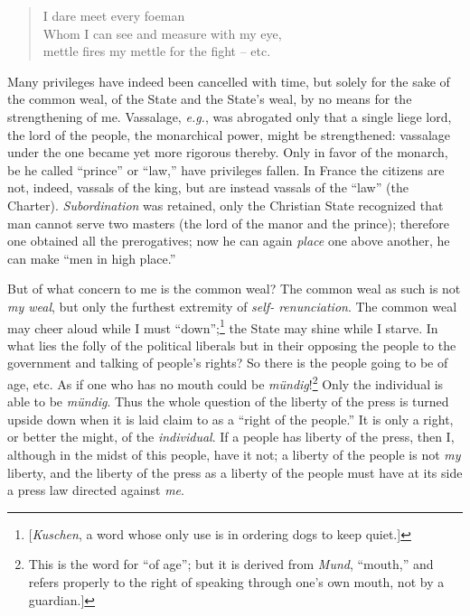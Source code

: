 \documentclass[12pt,a4paper]{book}
\begin{document}
\begin{quotation}

\noindent{} I dare meet every foeman\\
 Whom I can see and measure with my eye,\\
 mettle fires my mettle for the fight -- etc. \end{quotation}

\noindent{}Many privileges have indeed been cancelled with time, but solely 
for the sake of the common weal, of the State and the State's weal, by no 
means for the strengthening of me. Vassalage, \textit{e.g.}, was abrogated 
only that a single liege lord, the lord of the people, the monarchical power, 
might be strengthened: vassalage under the one became yet more rigorous 
thereby. Only in favor of the monarch, be he called ``prince'' or ``law,'' 
have privileges fallen. In France the citizens are not, indeed, vassals of the 
king, but are instead vassals of the ``law'' (the Charter). 
\textit{Subordination} was retained, only the Christian State recognized that 
man cannot serve two masters (the lord of the manor and the prince); therefore 
one obtained all the prerogatives; now he can again \textit{place} one above 
another, he can make ``men in high place.''

But of what concern to me is the common weal? The common weal as such is not 
\textit{my weal}, but only the furthest extremity of \textit{self- 
renunciation}. The common weal may cheer aloud while I must 
``down'';\footnote{[\textit{Kuschen}, a word whose only use is in ordering 
dogs to keep quiet.]} the State may shine while I starve. In what lies the 
folly of the political liberals but in their opposing the people to the 
government and talking of people's rights? So there is the people going to be 
of age, etc. As if one who has no mouth could be 
\textit{m\"undig}!\footnote{This is the word for ``of age''; but it is 
derived from \textit{Mund}, ``mouth,'' and refers properly to the right of 
speaking through one's own mouth, not by a guardian.]} Only the individual is 
able to be \textit{m\"undig}. Thus the whole question of the liberty of the 
press is turned upside down when it is laid claim to as a ``right of the 
people.'' It is only a right, or better the might, of the 
\textit{individual}. If a people has liberty of the press, then I, although in 
the midst of this people, have it not; a liberty of the people is not 
\textit{my} liberty, and the liberty of the press as a liberty of the people 
must have at its side a press law directed against \textit{me}.
\end{document}
